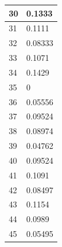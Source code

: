 \begin{tabular}{|l||l|}
	30 & 0.1333 \\ \hline
	31 & 0.1111 \\ \hline
	32 & 0.08333 \\ \hline
	33 & 0.1071 \\ \hline
	34 & 0.1429 \\ \hline
	35 & 0 \\ \hline
	36 & 0.05556 \\ \hline
	37 & 0.09524 \\ \hline
	38 & 0.08974 \\ \hline
	39 & 0.04762 \\ \hline
	40 & 0.09524 \\ \hline
	41 & 0.1091 \\ \hline
	42 & 0.08497 \\ \hline
	43 & 0.1154 \\ \hline
	44 & 0.0989 \\ \hline
	45 & 0.05495 \\ \hline
\end{tabular}
